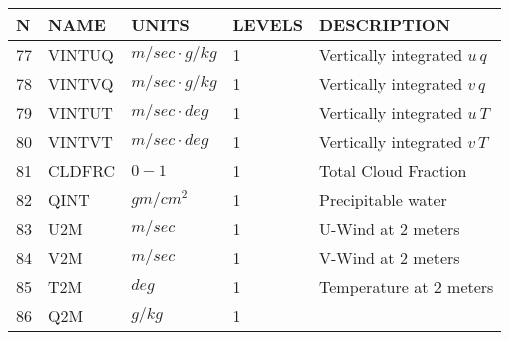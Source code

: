 \newpage
\vspace*{\fill}
\begin{tabular}{lllll}
\hline\hline
N & NAME & UNITS & LEVELS & DESCRIPTION \\
\hline

77 & VINTUQ  & $m/sec \cdot g/kg$ &    1
         &\begin{minipage}[t]{3in}
          {Vertically integrated $u \, q$} 
         \end{minipage}\\
78 & VINTVQ  & $m/sec \cdot g/kg$ &    1
         &\begin{minipage}[t]{3in}
          {Vertically integrated $v \, q$} 
         \end{minipage}\\
79 & VINTUT  & $m/sec \cdot deg$ &    1
         &\begin{minipage}[t]{3in}
          {Vertically integrated $u \, T$} 
         \end{minipage}\\
80 & VINTVT  & $m/sec \cdot deg$ &    1
         &\begin{minipage}[t]{3in}
          {Vertically integrated $v \, T$} 
         \end{minipage}\\
81 & CLDFRC  & $0-1$ &    1
         &\begin{minipage}[t]{3in}
          {Total Cloud Fraction} 
         \end{minipage}\\
82 & QINT    & $gm/cm^2$ &    1
         &\begin{minipage}[t]{3in}
          {Precipitable water} 
         \end{minipage}\\
83 & U2M     & $m/sec$ &    1
         &\begin{minipage}[t]{3in}
          {U-Wind at 2 meters}
         \end{minipage}\\
84 & V2M     & $m/sec$ &    1
         &\begin{minipage}[t]{3in}
          {V-Wind at 2 meters}
         \end{minipage}\\
85 & T2M     & $deg$ &    1
         &\begin{minipage}[t]{3in}
          {Temperature at 2 meters}
         \end{minipage}\\
86 & Q2M     & $g/kg$ &    1
         &\begin{minipage}[t]{3in}

\end{minipage}
\end{tabular}
